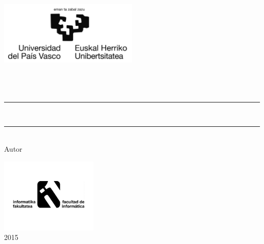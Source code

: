 \thispagestyle{empty}

\newcommand{\HRule}{\rule{\linewidth}{0.5mm}} 

\begin{center}
  \includegraphics[width=0.5\textwidth]{template/figs/ehu-logo-osoa.jpg} \\[1.3cm]
   {\Large \gradua}\\
   {\espezialitatea}\\[1.5cm]

  {\large {\gapizenburua}}\\[0.2cm]
\HRule \\[0.5cm]

{ \LARGE 
\begin{spacing}{1}
  \textbf{\izenburua}
\end{spacing}
}
 \vspace{0.5cm}
\HRule \\[2.0cm]

{ Autor \\}
{\Large \textsl{\egilea}}
\vspace{2.0 cm} 

\includegraphics[width=0.35\textwidth]{template/figs/logo_infor.pdf} \\[0.1cm]
{\large \textsf{2015}}

\end{center}

